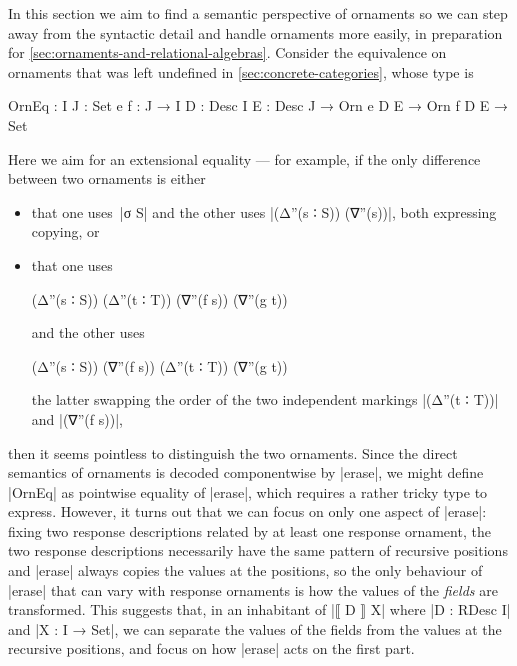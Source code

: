 In this section we aim to find a semantic perspective of ornaments so we can step away from the syntactic detail and handle ornaments more easily, in preparation for \autoref{sec:ornaments-and-relational-algebras}.
Consider the equivalence on ornaments that was left undefined in \autoref{sec:concrete-categories}, whose type is
\begin{code}
OrnEq :  {I J : Set} {e f : J → I} {D : Desc I} {E : Desc J} →
         Orn e D E → Orn f D E → Set
\end{code}
Here we aim for an extensional equality --- for example, if the only difference between two ornaments is either
\begin{itemize}
\item that one uses~|σ S| and the other uses |(Δ''(s ∶ S)) (∇''(s))|, both expressing copying, or
\item that one uses
\begin{code}
(Δ''(s ∶ S)) (Δ''(t ∶ T)) (∇''(f s)) (∇''(g t))
\end{code}
and the other uses
\begin{code}
(Δ''(s ∶ S)) (∇''(f s)) (Δ''(t ∶ T)) (∇''(g t))
\end{code}
the latter swapping the order of the two independent markings |(Δ''(t ∶ T))| and |(∇''(f s))|,
\end{itemize}
then it seems pointless to distinguish the two ornaments.
Since the direct semantics of ornaments is decoded componentwise by |erase|, we might define |OrnEq| as pointwise equality of |erase|, which requires a rather tricky type to express.
However, it turns out that we can focus on only one aspect of |erase|: fixing two response descriptions related by at least one response ornament, the two response descriptions necessarily have the same pattern of recursive positions and |erase| always copies the values at the positions, so the only behaviour of |erase| that can vary with response ornaments is how the values of the \emph{fields} are transformed.
This suggests that, in an inhabitant of |⟦ D ⟧ X| where |D : RDesc I| and |X : I → Set|, we can separate the values of the fields from the values at the recursive positions, and focus on how |erase| acts on the first part.

